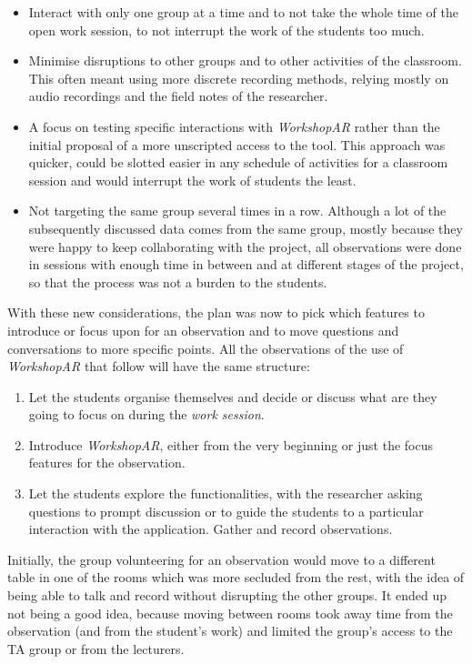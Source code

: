 \begin{itemize}
    \item Interact with only one group at a time and to not take the whole time of the open work session, to not interrupt the work of the students too much.
    \item Minimise disruptions to other groups and to other activities of the classroom. This often meant using more discrete recording methods, relying mostly on audio
    recordings and the field notes of the researcher.
    \item A focus on testing specific interactions with \emph{WorkshopAR} rather than the initial proposal of a more unscripted access to the tool. This approach was
    quicker, could be slotted easier in any schedule of activities for a classroom session and would interrupt the work of students the least.
    \item Not targeting the same group several times in a row. Although a lot of the subsequently discussed data comes from the same group, mostly because they were happy
    to keep collaborating with the project, all observations were done in sessions with enough time in between and at different stages of the project, so that the process
    was not a burden to the students.
\end{itemize}

With these new considerations, the plan was now to pick which features to introduce or focus upon for an observation and to move questions and conversations to more
specific points. All the observations of the use of \emph{WorkshopAR} that follow will have the same structure:

\begin{enumerate}
    \item Let the students organise themselves and decide or discuss what are they going to focus on during the \emph{work session}.
    \item Introduce \emph{WorkshopAR}, either from the very beginning or just the focus features for the observation.
    \item Let the students explore the functionalities, with the researcher asking questions to prompt discussion or to guide the students to a particular interaction with
    the application. Gather and record observations.
\end{enumerate}

Initially, the group volunteering for an observation would move to a different table in one of the rooms which was more secluded from the rest, with the idea of being able
to talk and record without disrupting the other groups. It ended up not being a good idea, because moving between rooms took away time from the observation (and from the
student's work) and limited the group's access to the \ac{TA} group or from the lecturers.

